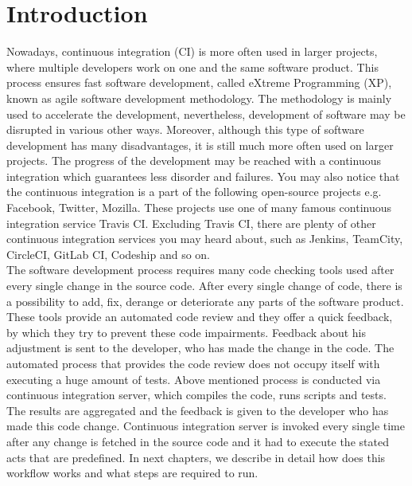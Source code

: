 
\newtheorem{DEF}{Definition}

\chapter{Introduction}

Nowadays, continuous integration (CI) is more often used in larger projects, where multiple developers work on one and the same software product. This process ensures fast software development, called eXtreme Programming (XP), known as agile software development methodology. The methodology is mainly used to accelerate the development, nevertheless, development of software may be disrupted in various other ways. Moreover, although this type of software development has many disadvantages, it is still much more often used on larger projects. The progress of the development may be reached with a continuous integration which guarantees less disorder and failures. You may also notice that the continuous integration is a part of the following open-source projects e.g. Facebook, Twitter, Mozilla. These projects use one of many famous continuous integration service Travis CI. Excluding Travis CI, there are plenty of other continuous integration services you may heard about, such as Jenkins, TeamCity, CircleCI, GitLab CI, Codeship and so on.\\[-0.6em]

The software development process requires many code checking tools used after every single change in the source code. After every single change of code, there is a possibility to add, fix, derange or deteriorate any parts of the software product. These tools provide an automated code review and they offer a quick feedback, by which they try to prevent these code impairments. Feedback about his adjustment is sent to the developer, who has made the change in the code. The automated process that provides the code review does not occupy itself with executing a huge amount of tests. Above mentioned process is conducted via continuous integration server, which compiles the code, runs scripts and tests. The results are aggregated and the feedback is given to the developer who has made this code change. Continuous integration server is invoked every single time after any change is fetched in the source code and it had to execute the stated acts that are predefined. In next chapters, we describe in detail how does this workflow works and what steps are required to run.\\[-0.6em]

